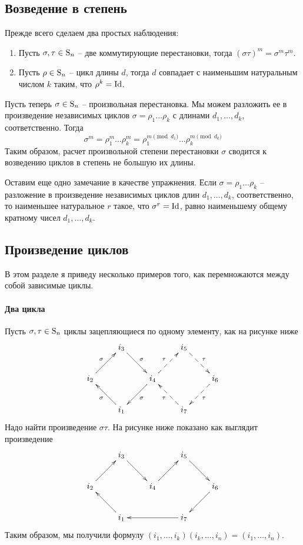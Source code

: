 \subsection{Возведение в степень}

Прежде всего сделаем два простых наблюдения:
\begin{enumerate}
\item Пусть $\sigma, \tau\in \operatorname{S}_{n}$ -- две коммутирующие перестановки, тогда $(\sigma \tau)^m = \sigma^m \tau^m$.

\item Пусть $\rho \in\operatorname{S}_{n}$ -- цикл длины $d$, тогда $d$ совпадает с наименьшим натуральным числом $k$ таким, что $\rho^k = \operatorname{Id}$.
\end{enumerate}

Пусть теперь $\sigma\in\operatorname{S}_{n}$ -- произвольная перестановка.
Мы можем разложить ее в произведение независимых циклов $\sigma = \rho_1 \ldots \rho_k$ с длинами $d_1, \ldots, d_k$, соответственно.
Тогда 
\[
\sigma^m = \rho_1^m \ldots \rho_k^m = \rho_1^{m\pmod{d_1}}\ldots \rho_k^{m \pmod{d_k}}
\]
Таким образом, расчет произвольной степени перестановки $\sigma$ сводится к возведению циклов в степень не большую их длины.

Оставим еще одно замечание в качестве упражнения.
Если $\sigma = \rho_1\ldots \rho_k$ -- разложение в произведение независимых циклов длин $d_1,\ldots,d_k$, соответственно, то наименьшее натуральное $r$ такое, что $\sigma^r = \operatorname{Id}$, равно наименьшему общему кратному чисел $d_1,\ldots,d_k$.


\subsection{Произведение циклов}

В этом разделе я приведу несколько примеров того, как перемножаются между собой зависимые циклы.

\paragraph{Два цикла}

Пусть $\sigma,\tau\in \operatorname{S}_{n}$ циклы зацепляющиеся по одному элементу, как на рисунке ниже
\[
\xymatrix{
	{}&{i_3}\ar[dr]^{\sigma}&{}&{i_5}\ar@{-->}[dr]^{\tau}&{}\\
	{i_2}\ar[ur]^{\sigma}&{}&{i_4}\ar[dl]^{\sigma}\ar@{-->}[ur]^{\tau}&{}&{i_6}\ar@{-->}[dl]^{\tau}\\
	{}&{i_1}\ar[ul]^{\sigma}&{}&{i_7}\ar@{-->}[ul]^{\tau}&{}\\
}
\]
Надо найти произведение $\sigma\tau$.
На рисунке ниже показано как выглядит произведение
\[
\xymatrix{
	{}&{i_3}\ar[dr]&{}&{i_5}\ar[dr]&{}\\
	{i_2}\ar[ur]&{}&{i_4}
	\ar[ur]&{}&{i_6}\ar[dl]\\
	{}&{i_1}\ar[ul]&{}&{i_7}\ar[ll]&{}\\
}
\]
Таким образом, мы получили формулу $(i_1,\ldots,i_k)(i_k,\ldots,i_n) = (i_1,\ldots,i_n)$.

